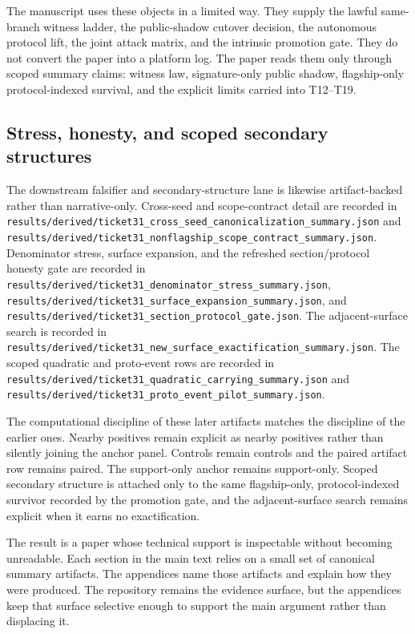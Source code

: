 \documentclass[11pt]{article}
\theoremstyle{definition}
\begin{document}
The manuscript uses these objects in a limited way. They supply the lawful same-branch
witness ladder, the public-shadow cutover decision, the autonomous protocol lift, the
joint attack matrix, and the intrinsic promotion gate. They do not convert the paper into
a platform log. The paper reads them only through scoped summary claims: witness law,
signature-only public shadow, flagship-only protocol-indexed survival, and the explicit
limits carried into T12--T19.

\subsection{Stress, honesty, and scoped secondary structures}

The downstream falsifier and secondary-structure lane is likewise artifact-backed rather
than narrative-only. Cross-seed and scope-contract detail are recorded in
\nolinkurl{results/derived/ticket31_cross_seed_canonicalization_summary.json} and
\nolinkurl{results/derived/ticket31_nonflagship_scope_contract_summary.json}. Denominator
stress, surface expansion, and the refreshed section/protocol honesty gate are recorded in
\nolinkurl{results/derived/ticket31_denominator_stress_summary.json},
\nolinkurl{results/derived/ticket31_surface_expansion_summary.json}, and
\nolinkurl{results/derived/ticket31_section_protocol_gate.json}. The adjacent-surface search
is recorded in
\nolinkurl{results/derived/ticket31_new_surface_exactification_summary.json}. The scoped
quadratic and proto-event rows are recorded in
\nolinkurl{results/derived/ticket31_quadratic_carrying_summary.json} and
\nolinkurl{results/derived/ticket31_proto_event_pilot_summary.json}.

The computational discipline of these later artifacts matches the discipline of the earlier
ones. Nearby positives remain explicit as nearby positives rather than silently joining the
anchor panel. Controls remain controls and the paired artifact row remains paired. The
support-only anchor remains support-only. Scoped secondary structure is attached only to the
same flagship-only, protocol-indexed survivor recorded by the promotion gate, and the
adjacent-surface search remains explicit when it earns no exactification.

The result is a paper whose technical support is inspectable without becoming unreadable.
Each section in the main text relies on a small set of canonical summary artifacts. The
appendices name those artifacts and explain how they were produced. The repository remains
the evidence surface, but the appendices keep that surface selective enough to support the
main argument rather than displacing it.
\end{document}
